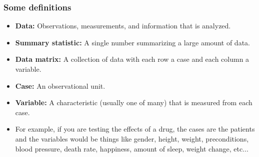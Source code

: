 



\begin{frame}
\frametitle{Some definitions}

\begin{itemize}
\item {\bf Data:} \pause Observations, measurements, and information that is analyzed. \pause
\item {\bf Summary statistic:} \pause A single number summarizing a large amount of data. \pause
\item {\bf Data matrix:} \pause A collection of data with each row a case and each column a variable. \pause
\item {\bf Case:} \pause An observational unit. \pause
\item {\bf Variable:} \pause A characteristic (usually one of many) that is measured from each case.

\item For example, if you are testing the effects of a drug, the cases are the patients and the variables would be things like gender, height, weight, preconditions, blood pressure, death rate, happiness, amount of sleep, weight change, etc...

\end{itemize}

\end{frame}





